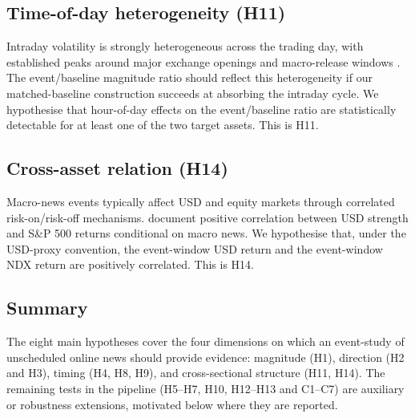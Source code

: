 \subsection{Time-of-day heterogeneity (H11)}

Intraday volatility is strongly heterogeneous across the trading
day, with established peaks around major exchange openings and
macro-release windows \citep{andersen2003micro}. The event/baseline
magnitude ratio should reflect this heterogeneity if our
matched-baseline construction succeeds at absorbing the
intraday cycle. We hypothesise that hour-of-day effects on the
event/baseline ratio are statistically detectable for at least one
of the two target assets. This is H11.

\subsection{Cross-asset relation (H14)}

Macro-news events typically affect USD and equity markets through
correlated risk-on/risk-off mechanisms. \citet{andersen2003micro}
document positive correlation between USD strength and S\&P 500
returns conditional on macro news. We hypothesise that, under the
USD-proxy convention, the event-window USD return and the
event-window NDX return are positively correlated. This is H14.

\subsection{Summary}

The eight main hypotheses cover the four dimensions on which an
event-study of unscheduled online news should provide evidence:
magnitude (H1), direction (H2 and H3), timing (H4, H8, H9), and
cross-sectional structure (H11, H14). The remaining tests in the
pipeline (H5--H7, H10, H12--H13 and C1--C7) are auxiliary or
robustness extensions, motivated below where they are reported.
